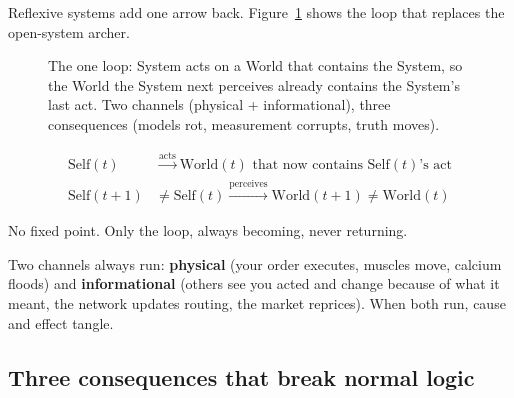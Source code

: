 \documentclass[11pt]{article}
\begin{document}
Reflexive systems add one arrow back. Figure~\ref{fig:oneloop} shows the loop that replaces the open-system archer.

\begin{figure}[h]
\centering
{}
\caption{The one loop: System acts on a World that contains the System, so the World the System next perceives already contains the System's last act. Two channels (physical + informational), three consequences (models rot, measurement corrupts, truth moves).}
\label{fig:oneloop}
\end{figure}

\begin{equation}
\begin{aligned}
\text{Self}(t) &\xrightarrow{\text{acts}} \text{World}(t) \text{ that now contains Self}(t)\text{'s act} \\
\text{Self}(t{+}1) &\neq \text{Self}(t) \xrightarrow{\text{perceives}} \text{World}(t{+}1) \neq \text{World}(t)
\end{aligned}
\end{equation}

No fixed point. Only the loop, always becoming, never returning.

Two channels always run: \textbf{physical} (your order executes, muscles move, calcium floods) and \textbf{informational} (others see you acted and change because of what it meant, the network updates routing, the market reprices). When both run, cause and effect tangle.

\subsection{Three consequences that break normal logic}
\end{document}
